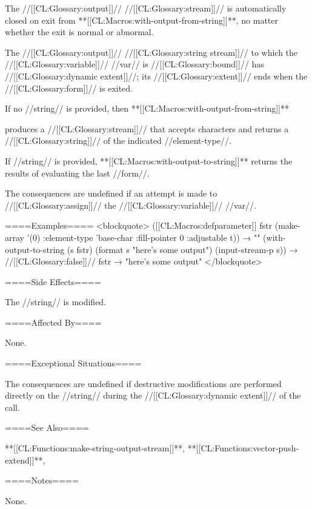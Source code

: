 The //[[CL:Glossary:output]]// //[[CL:Glossary:stream]]// is automatically closed on exit from **[[CL:Macros:with-output-from-string]]**, no matter whether the exit is normal or abnormal.

The //[[CL:Glossary:output]]// //[[CL:Glossary:string stream]]// to which the //[[CL:Glossary:variable]]// //var// is //[[CL:Glossary:bound]]// has //[[CL:Glossary:dynamic extent]]//; its //[[CL:Glossary:extent]]// ends when the //[[CL:Glossary:form]]// is exited.

If no //string// is provided, then **[[CL:Macros:with-output-from-string]]**

produces a //[[CL:Glossary:stream]]// that accepts characters and returns a //[[CL:Glossary:string]]// of the indicated //element-type//.

If //string// is provided, **[[CL:Macros:with-output-to-string]]** returns the results of evaluating the last //form//.

The consequences are undefined if an attempt is made to //[[CL:Glossary:assign]]// the //[[CL:Glossary:variable]]// //var//.

====Examples==== <blockquote> ([[CL:Macros:defparameter]] fstr (make-array '(0) :element-type 'base-char :fill-pointer 0 :adjustable t)) → "" (with-output-to-string (s fstr) (format s "here's some output") (input-stream-p s)) → //[[CL:Glossary:false]]// fstr → "here's some output" </blockquote>

====Side Effects====

The //string// is modified.

====Affected By====

None.

====Exceptional Situations====

The consequences are undefined if destructive modifications are performed directly on the //string// during the //[[CL:Glossary:dynamic extent]]// of the call.

====See Also====

**[[CL:Functions:make-string-output-stream]]**, **[[CL:Functions:vector-push-extend]]**,

{\secref\TraversalRules}

====Notes====

None.

          
